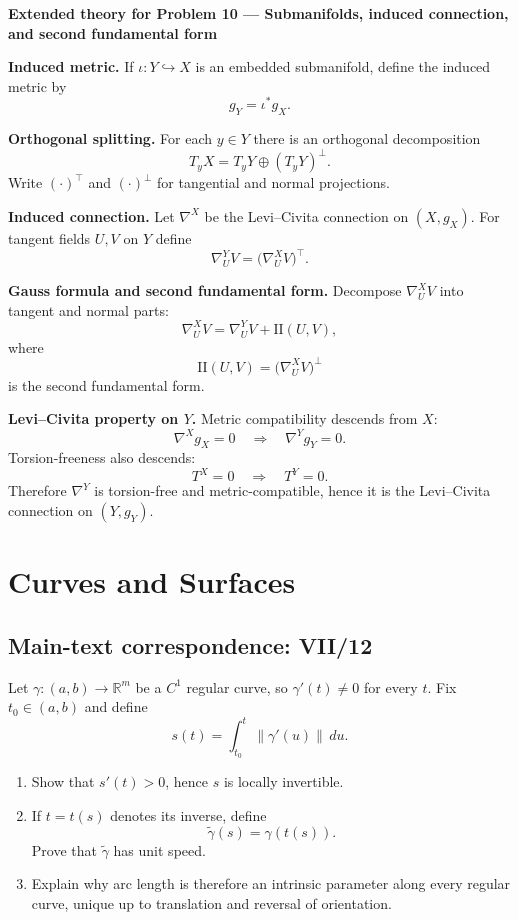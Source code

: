 \begin{solution}
\par\medskip\noindent\textbf{Extended theory for Problem 10 --- Submanifolds, induced connection, and second fundamental form}\par\smallskip


\textbf{Induced metric.}
If $\iota:Y\hookrightarrow X$ is an embedded submanifold, define the induced metric by
\[
g_Y=\iota^*g_X.
\]

\textbf{Orthogonal splitting.}
For each $y\in Y$ there is an orthogonal decomposition
\[
T_yX=T_yY\oplus (T_yY)^\perp.
\]
Write $(\cdot)^\top$ and $(\cdot)^\perp$ for tangential and normal projections.

\textbf{Induced connection.}
Let $\nabla^X$ be the Levi--Civita connection on $(X,g_X)$.
For tangent fields $U,V$ on $Y$ define
\[
\nabla^Y_U V=\bigl(\nabla^X_U V\bigr)^\top.
\]

\textbf{Gauss formula and second fundamental form.}
Decompose $\nabla^X_U V$ into tangent and normal parts:
\[
\nabla^X_U V=\nabla^Y_U V+\mathrm{II}(U,V),
\]
where
\[
\mathrm{II}(U,V)=\bigl(\nabla^X_U V\bigr)^\perp
\]
is the second fundamental form.

\textbf{Levi--Civita property on $Y$.}
Metric compatibility descends from $X$:
\[
\nabla^X g_X=0
\quad\Longrightarrow\quad
\nabla^Y g_Y=0.
\]
Torsion-freeness also descends:
\[
T^X=0
\quad\Longrightarrow\quad
T^Y=0.
\]
Therefore $\nabla^Y$ is torsion-free and metric-compatible, hence it is the Levi--Civita connection on $(Y,g_Y)$.
\end{solution}

\section{Curves and Surfaces}

\subsection*{Main-text correspondence: VII/12}

\begin{problem}
\label{prob:cp-vii-0040}
Let \(\gamma:(a,b)\to\mathbb R^m\) be a \(C^1\) regular curve, so
\(\gamma'(t)\neq0\) for every \(t\). Fix \(t_0\in(a,b)\) and define
\[
s(t)=\int_{t_0}^{t}\|\gamma'(u)\|\,du.
\]

\begin{enumerate}
\item Show that \(s'(t)>0\), hence \(s\) is locally invertible.
\item If \(t=t(s)\) denotes its inverse, define
\[
\widetilde\gamma(s)=\gamma(t(s)).
\]
Prove that \(\widetilde\gamma\) has unit speed.
\item Explain why arc length is therefore an intrinsic parameter along every
regular curve, unique up to translation and reversal of orientation.
\end{enumerate}
\end{problem}


